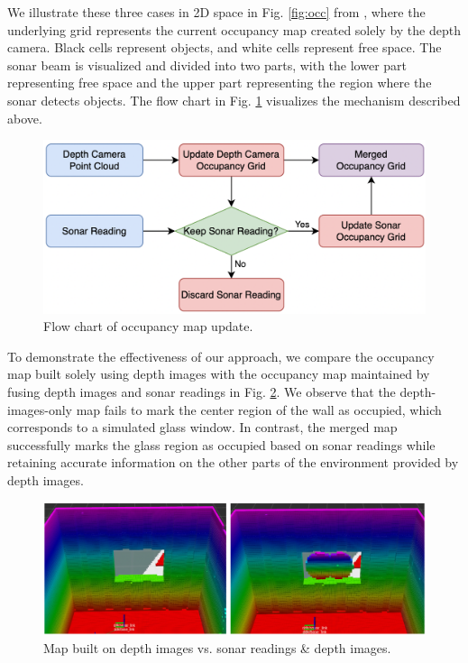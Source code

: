 We illustrate these three cases in 2D space in Fig. \ref{fig:occ} from \cite{camerafusion}, where the underlying grid represents the current occupancy map created solely by the depth camera. Black cells represent objects, and white cells represent free space. The sonar beam is visualized and divided into two parts, with the lower part representing free space and the upper part representing the region where the sonar detects objects. The flow chart in Fig. \ref{fig:occ_flow} visualizes the mechanism described above.

\begin{figure}[h]
    \centering
    \includegraphics[width=0.8\columnwidth]{fig/occ_flow.png}
    \caption{Flow chart of occupancy map update.}
    \label{fig:occ_flow}
\end{figure}

To demonstrate the effectiveness of our approach, we compare the occupancy map built solely using depth images with the occupancy map maintained by fusing depth images and sonar readings in Fig. \ref{fig:occ_comp}. We observe that the depth-images-only map fails to mark the center region of the wall as occupied, which corresponds to a simulated glass window. In contrast, the merged map successfully marks the glass region as occupied based on sonar readings while retaining accurate information on the other parts of the environment provided by depth images.

\begin{figure}[h]
    \centering
    \includegraphics[width=1\columnwidth]{fig/occ_comp.png}
    \caption{Map built on depth images vs. sonar readings \& depth images.}
    \label{fig:occ_comp}
\end{figure}

